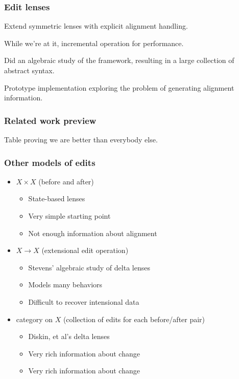 \documentclass{beamer}
\begin{document}
\begin{frame}
    \frametitle{Edit lenses}
    Extend symmetric lenses with explicit alignment handling.

    While we're at it, incremental operation for performance.

    Did an algebraic study of the framework, resulting in a large collection
    of abstract syntax.

    Prototype implementation exploring the problem of generating alignment
    information.
\end{frame}

\begin{frame}
    \frametitle{Related work preview}
    Table proving we are better than everybody else.
\end{frame}

\begin{frame}
    \frametitle{Other models of edits}

    \begin{itemize}
        \item $X \times X$ (before and after)
            \begin{itemize}
                \item State-based lenses
                \item[\ybullet] Very simple starting point
                \item[\nbullet] Not enough information about alignment
            \end{itemize}
        \item $X \to X$ (extensional edit operation)
            \begin{itemize}
                \item Stevens' algebraic study of delta lenses
                \item[\ybullet] Models many behaviors
                \item[\nbullet] Difficult to recover intensional data
            \end{itemize}
        \item category on $X$ (collection of edits for each before/after
            pair)
            \begin{itemize}
                \item Diskin, et al's delta lenses
                \item[\ybullet] Very rich information about change
                \item[\nbullet] Very rich information about change
            \end{itemize}
    \end{itemize}
\end{frame}
\end{document}
